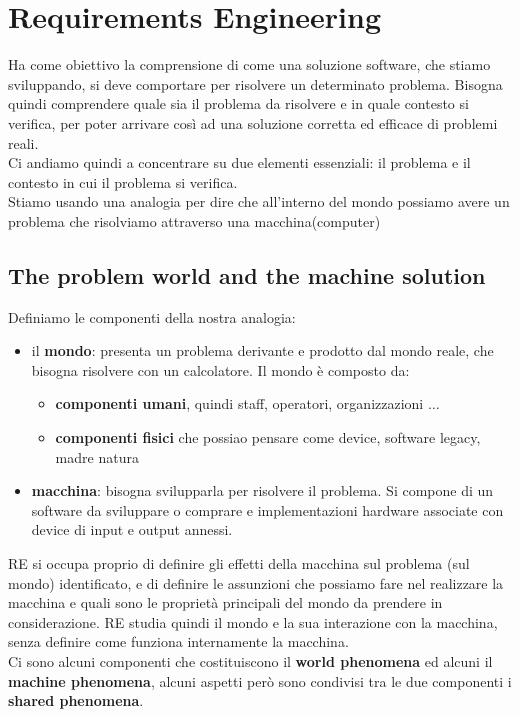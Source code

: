 \section{Requirements Engineering}
Ha come obiettivo la comprensione di come una soluzione software, che stiamo sviluppando, si deve comportare per risolvere un determinato problema. Bisogna quindi comprendere quale sia il problema da risolvere e in quale contesto si verifica, per poter arrivare così ad una soluzione corretta ed efficace di problemi reali.\\
Ci andiamo quindi a concentrare su due elementi essenziali: il problema e il contesto in cui il problema si verifica. \\

Stiamo usando una analogia per dire che all'interno del mondo possiamo avere un problema che risolviamo attraverso una macchina(computer)
\subsection{The problem world and the machine solution}
Definiamo le componenti della nostra analogia:
\begin{itemize}
    \item il \textbf{mondo}: presenta un problema derivante e prodotto dal mondo reale, che bisogna risolvere con un calcolatore. Il mondo è composto da:
        \begin{itemize}
            \item \textbf{componenti umani}, quindi staff, operatori, organizzazioni $\dots$
            \item \textbf{componenti fisici} che possiao pensare come device, software legacy, madre natura
        \end{itemize}
    \item \textbf{macchina}: bisogna svilupparla per risolvere il problema. Si compone di un software da sviluppare o comprare e implementazioni hardware associate con device di input e output annessi.
\end{itemize} 
RE si occupa proprio di definire gli effetti della macchina sul problema (sul mondo) identificato, e di definire le assunzioni che possiamo fare nel realizzare la macchina e quali sono le proprietà principali del mondo da prendere in considerazione.
RE studia quindi il mondo e la sua interazione con la macchina, senza definire come funziona internamente la macchina.\\
Ci sono alcuni componenti che costituiscono il \textbf{world phenomena} ed alcuni il \textbf{machine phenomena}, alcuni aspetti però sono condivisi tra le due componenti i \textbf{shared phenomena}.

